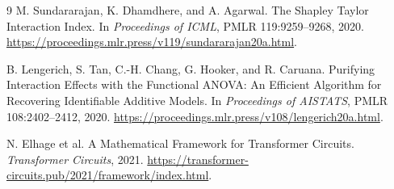 \documentclass[11pt]{article}
\theoremstyle{plain}
\theoremstyle{definition}
\theoremstyle{remark}
\begin{document}
\begin{thebibliography}{9}
M. Sundararajan, K. Dhamdhere, and A. Agarwal.
\newblock The Shapley Taylor Interaction Index.
\newblock In \emph{Proceedings of ICML}, PMLR 119:9259--9268, 2020.
\newblock \url{https://proceedings.mlr.press/v119/sundararajan20a.html}.

B. Lengerich, S. Tan, C.-H. Chang, G. Hooker, and R. Caruana.
\newblock Purifying Interaction Effects with the Functional ANOVA: An Efficient Algorithm for Recovering Identifiable Additive Models.
\newblock In \emph{Proceedings of AISTATS}, PMLR 108:2402--2412, 2020.
\newblock \url{https://proceedings.mlr.press/v108/lengerich20a.html}.

N. Elhage et al.
\newblock A Mathematical Framework for Transformer Circuits.
\newblock \emph{Transformer Circuits}, 2021.
\newblock \url{https://transformer-circuits.pub/2021/framework/index.html}.
\end{thebibliography}
\end{document}
